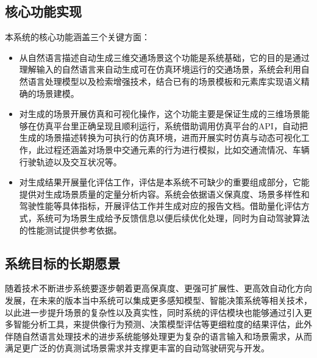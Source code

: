 \subsection{核心功能实现}
本系统的核心功能涵盖三个关键方面：
\begin{itemize}
	\item 从自然语言描述自动生成三维交通场景这个功能是系统基础，它的目的是通过理解输入的自然语言来自动生成可在仿真环境运行的交通场景，系统会利用自然语言处理模型以及检索增强技术，结合已有的场景模板和元素库实现语义精确的场景建模。
	\item 对生成的场景开展仿真和可视化操作，这个功能主要是保证生成的三维场景能够在仿真平台里正确呈现且顺利运行，系统借助调用仿真平台的API，自动把生成的场景描述转换为可执行的仿真环境，进而开展实时仿真与动态可视化工作，此过程还涵盖对场景中交通元素的行为进行模拟，比如交通流情况、车辆行驶轨迹以及交互状况等。
	\item 对生成结果开展量化评估工作，评估是本系统不可缺少的重要组成部分，它能提供对生成场景质量的定量分析内容。系统会依据语义保真度、场景多样性和驾驶性能等具体指标，开展评估工作并生成对应的报告文档。借助量化评估方式，系统可为场景生成给予反馈信息以便后续优化处理，同时为自动驾驶算法的性能测试提供参考依据。
\end{itemize}

\subsection{系统目标的长期愿景}
随着技术不断进步系统要逐步朝着更高保真度、更强可扩展性、更高效自动化方向发展，在未来的版本当中系统可以集成更多感知模型、智能决策系统等相关技术，以此进一步提升场景的复杂性以及真实性，同时系统的评估模块也能够通过引入更多智能分析工具，来提供像行为预测、决策模型评估等更细粒度的结果评估，此外伴随自然语言处理技术的进步系统能够处理更为复杂的语言输入和场景需求，从而满足更广泛的仿真测试场景需求并支撑更丰富的自动驾驶研究与开发。

